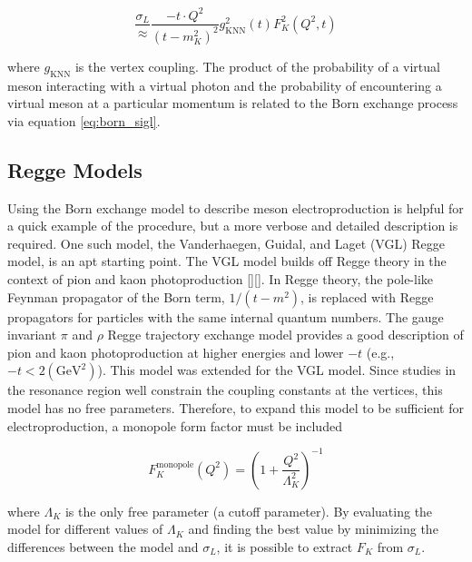 \documentclass[
]{report}
\begin{document}
\begin{equation}
\frac{\sigma_L}\approx\frac{-t\cdot Q^2}{(t-m_{K}^2)^2}g_{\mathrm{KNN}}^2(t)F_K^2(Q^2,t)
\label{eq:born_sigl} 
\end{equation}

\noindent where \(g_{\mathrm{KNN}}\) is the vertex coupling. The product
of the probability of a virtual meson interacting with a virtual photon
and the probability of encountering a virtual meson at a particular
momentum is related to the Born exchange process via equation
\ref{eq:born_sigl}.

\hypertarget{regge-models}{%
\subsection{Regge Models}\label{regge-models}}

Using the Born exchange model to describe meson electroproduction is
helpful for a quick example of the procedure, but a more verbose and
detailed description is required. One such model, the Vanderhaegen,
Guidal, and Laget (VGL) Regge model, is an apt starting point. The VGL
model builds off Regge theory in the context of pion and kaon
photoproduction
{[}\cite{eden_regge_1971}{]}{[}\cite{vanderhaeghen_regge_1998}{]}. In
Regge theory, the pole-like Feynman propagator of the Born term,
\(1/(t-m^2)\), is replaced with Regge propagators for particles with the
same internal quantum numbers. The gauge invariant \(\pi\) and \(\rho\)
Regge trajectory exchange model provides a good description of pion and
kaon photoproduction at higher energies and lower \(-t\) (e.g.,
\(-t<2 (\mathrm{GeV}^2)\)). This model was extended for the VGL model.
Since studies in the resonance region well constrain the coupling
constants at the vertices, this model has no free parameters. Therefore,
to expand this model to be sufficient for electroproduction, a monopole
form factor must be included

\begin{equation}
    F_{K}^{\mathrm{monopole}}(Q^2)=(1+\frac{Q^2}{\Lambda_{K}^2})^{-1}
\label{eq:ff_mono} 
\end{equation}

\noindent where \(\Lambda_{K}\) is the only free parameter (a cutoff
parameter). By evaluating the model for different values of
\(\Lambda_{K}\) and finding the best value by minimizing the differences
between the model and \(\sigma_L\), it is possible to extract \(F_{K}\)
from \(\sigma_L\).

\label{Chapter-1-4}
\end{document}
